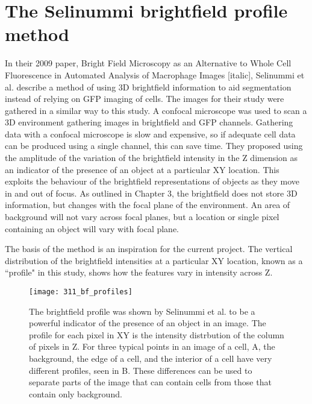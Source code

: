\section{The Selinummi brightfield profile method}

In their 2009 paper, Bright Field Microscopy as an Alternative to Whole Cell Fluorescence in Automated Analysis of Macrophage Images [italic], Selinummi et al. describe a method of using 3D brightfield information to aid segmentation instead of relying on GFP imaging of cells. The images for their study were gathered in a similar way to this study. A confocal microscope was used to scan a 3D environment gathering images in brightfield and GFP channels. Gathering data with a confocal microscope is slow and expensive, so if adequate cell data can be produced using a single channel, this can save time. They proposed using the amplitude of the variation of the brightfield intensity in the Z dimension as an indicator of the presence of an object at a particular XY location. This exploits the behaviour of the brightfield representations of objects as they move in and out of focus. As outlined in Chapter 3, the brightfield does not store 3D information, but changes with the focal plane of the environment. An area of background will not vary across focal planes, but a location or single pixel containing an object will vary with focal plane.

The basis of the method is an inspiration for the current project. The vertical distribution of the brightfield intensities at a particular XY location, known as a ``profile" in this study, shows how the features vary in intensity across Z.

\begin{figure}[h!]
 \centering
 \texttt{[image: 311\_bf\_profiles]}
 \caption[Selinummi brightfield profile]{
 	The brightfield profile was shown by Selinummi et al. to be a powerful indicator of the presence of an object in an image. The profile for each pixel in XY is the intensity distrbution of the column of pixels in Z. For three typical points in an image of a cell, A, the background, the edge of a cell, and the interior of a cell have very different profiles, seen in B. These differences can be used to separate parts of the image that can contain cells from those that contain only background.
 }
 \label{fig:brightfieldprofile}
\end{figure}

